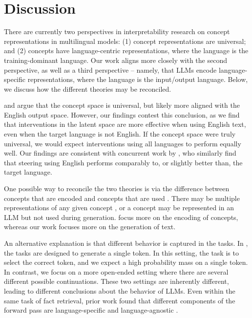 \section{Discussion} \label{sec:discussions}
There are currently two perspectives in interpretability research on concept representations in multilingual models: (1) concept representations are universal; and (2) concepts have language-centric representations, where the language is the training-dominant language. 
Our work aligns more closely with the second perspective, as well as a third perspective -- namely, that LLMs encode language-specific representations, where the language is the input/output language. Below, we discuss how the different theories may be reconciled. 

\citet{wendler2024llamasworkenglishlatent} and \citet{dumas2024llamas} argue that 
the concept space is universal, but likely more aligned with the English output space. 
However, our findings contest this conclusion, as we find that interventions in the latent space are more effective when using English text, even when the target language is not English. 
If the concept space were truly universal, we would expect interventions using all languages to perform equally well. Our findings are consistent with concurrent work by \citet{wu2024semantic}, who similarly find that steering using English performs comparably to, or slightly better than, the target language.

One possible way to reconcile the two theories is via the difference between concepts that are encoded and concepts that are used \citep[as discussed in][]{brinkmann2025large}. 
There may be multiple representations of any given concept \citep{hase, mcgrath2023hydraeffectemergentselfrepair}, or a concept may be represented in an LLM but not used during generation.
\citet{wendler2024llamasworkenglishlatent} focus more on the encoding of concepts, whereas our work focuses more on the generation of text. 

An alternative explanation is that different behavior is captured in the tasks. In \citet{wendler2024llamasworkenglishlatent, dumas2024llamas}, the tasks are designed to generate a single token. In this setting, the task is to select the correct token, and we expect a high probability mass on a single token. In contrast, we focus on a more open-ended setting where there are several different possible continuations. These two settings are inherently different, leading to different conclusions about the behavior of LLMs. Even within the same task of fact retrieval, prior work found that different components of the forward pass are language-specific and language-agnostic \citep{fierro2025multilinguallanguagemodelsremember}. 

